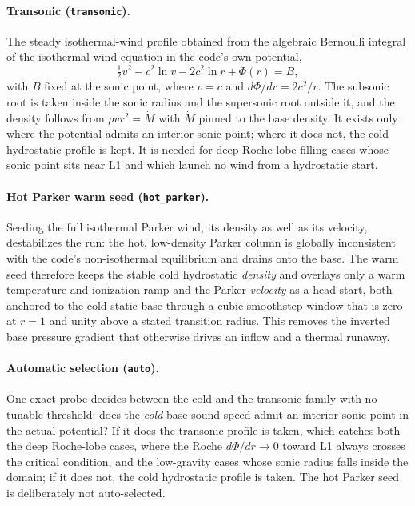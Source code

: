 \paragraph{Transonic (\texttt{transonic}).}
The steady isothermal-wind profile obtained from the algebraic Bernoulli
integral of the isothermal wind equation in the code's own potential,
%
\begin{equation}
  \tfrac12 v^2 - c^2\ln v - 2c^2\ln r + \Phi(r) = B,
  \label{eq:parker}
\end{equation}
%
with $B$ fixed at the sonic point, where $v = c$ and
$d\Phi/dr = 2c^2/r$.  The subsonic root is taken inside the sonic radius and
the supersonic root outside it, and the density follows from
$\rho v r^2 = \dot M$ with $\dot M$ pinned to the base density.  It exists only
where the potential admits an interior sonic point; where it does not, the
cold hydrostatic profile is kept.  It is needed for deep Roche-lobe-filling
cases whose sonic point sits near L1 and which launch no wind from a
hydrostatic start.

\paragraph{Hot Parker warm seed (\texttt{hot\_parker}).}
Seeding the full isothermal Parker wind, its density as well as its velocity,
destabilizes the run: the hot, low-density Parker column is globally
inconsistent with the code's non-isothermal equilibrium and drains onto the
base.  The warm seed therefore keeps the stable cold hydrostatic
\emph{density} and overlays only a warm temperature and ionization ramp and
the Parker \emph{velocity} as a head start, both anchored to the cold static
base through a cubic smoothstep window that is zero at $r = 1$ and unity above
a stated transition radius.  This removes the inverted base pressure gradient
that otherwise drives an inflow and a thermal runaway.

\paragraph{Automatic selection (\texttt{auto}).}
One exact probe decides between the cold and the transonic family with no
tunable threshold: does the \emph{cold} base sound speed admit an interior
sonic point in the actual potential?  If it does the transonic profile is
taken, which catches both the deep Roche-lobe cases, where the Roche
$d\Phi/dr \to 0$ toward L1 always crosses the critical condition, and the
low-gravity cases whose sonic radius falls inside the domain; if it does not,
the cold hydrostatic profile is taken.  The hot Parker seed is deliberately not
auto-selected.

